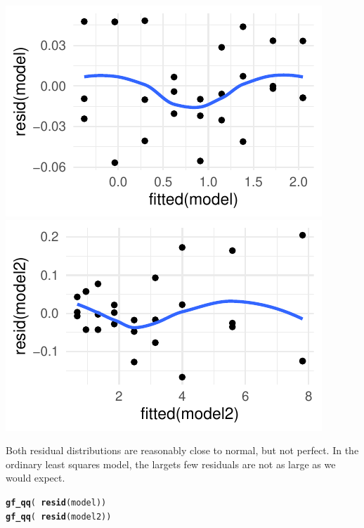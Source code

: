 \documentclass[twoside]{book}\usepackage[]{graphicx}\usepackage[]{xcolor}
\makeatletter
\def\maxwidth{ %
  \ifdim\Gin@nat@width>\linewidth
    \linewidth
  \else
    \Gin@nat@width
  \fi
}
\newcommand{\hlopt}[1]{\textcolor[rgb]{0,0,0}{#1}}%
\newcommand{\hlstd}[1]{\textcolor[rgb]{0.345,0.345,0.345}{#1}}%
\newcommand{\hlkwd}[1]{\textcolor[rgb]{0.737,0.353,0.396}{\textbf{#1}}}%
\newenvironment{kframe}{%
 \def\at@end@of@kframe{}%
 \ifinner\ifhmode%
  \def\at@end@of@kframe{\end{minipage}}%
  \begin{minipage}{\columnwidth}%
 \fi\fi%
 \def\FrameCommand##1{\hskip\@totalleftmargin \hskip-\fboxsep
 \colorbox{shadecolor}{##1}\hskip-\fboxsep
     \hskip-\linewidth \hskip-\@totalleftmargin \hskip\columnwidth}%
 \MakeFramed {\advance\hsize-\width
   \@totalleftmargin\z@ \linewidth\hsize
   \@setminipage}}%
 {\par\unskip\endMakeFramed%
 \at@end@of@kframe}
\newenvironment{knitrout}{}{} %
\makeatother
\begin{document}
\begin{solution}
\begin{knitrout}
\begin{kframe}
{\ttfamily\noindent\itshape\color{messagecolor}{\#\# `geom\_smooth()` using method = 'loess'}}\end{kframe}

{\centering \includegraphics[width=\maxwidth]{figures/fig-unnamed-chunk-258-1} 
\includegraphics[width=\maxwidth]{figures/fig-unnamed-chunk-258-2} 

}



\end{knitrout}
	Both residual distributions are reasonably close to normal, but not perfect.
	In the ordinary least squares model, the largets few residuals are not as large
	as we would expect.
\begin{knitrout}
\color{fgcolor}\begin{kframe}
\begin{alltt}
\hlkwd{gf_qq}\hlstd{(} \hlopt{~} \hlkwd{resid}\hlstd{(model))}
\hlkwd{gf_qq}\hlstd{(} \hlopt{~} \hlkwd{resid}\hlstd{(model2))}
\end{alltt}
\end{kframe}


\end{knitrout}
\end{solution}
\end{document}
